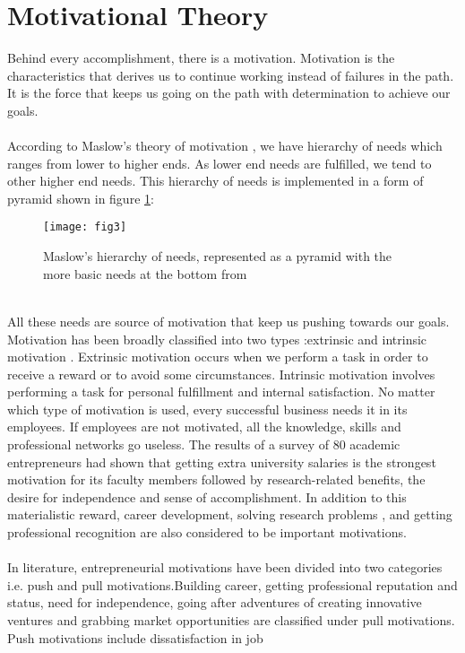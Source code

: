 \section{Motivational Theory\label{sec:motivation-based-theory}}
Behind every accomplishment, there is a motivation. Motivation is the characteristics that
derives us to continue working instead of failures in the path. It is the force that keeps us going on
the path with determination to achieve our goals.
\\
\\
According to Maslow’s theory of motivation \cite{47}, we have hierarchy of needs which ranges from
lower to higher ends. As lower end needs are fulfilled, we tend to other higher end needs. This
hierarchy of needs is implemented in a form of pyramid shown in figure \ref{fig3}:
\begin{figure}[!h]
	\centering
	\texttt{[image: fig3]}
	\caption{Maslow's hierarchy of needs, represented as a pyramid with the more basic needs at
		the bottom from \cite{47}}
	\label{fig3}
\end{figure}
\\
All these needs are source of motivation that keep us pushing towards our goals. Motivation has
been broadly classified into two types :extrinsic and intrinsic motivation \cite{48}. Extrinsic motivation
occurs when we perform a task in order to receive a reward or to avoid some circumstances.
Intrinsic motivation involves performing a task for personal fulfillment and internal satisfaction. No
matter which type of motivation is used, every successful business needs it in its employees. If
employees are not motivated, all the knowledge, skills and professional networks go useless. The
results of a survey of 80 academic entrepreneurs \cite{49} had shown that getting extra university
salaries is the strongest motivation for its faculty members followed by research-related benefits,
the desire for independence and sense of accomplishment. In addition to this materialistic reward,
career development, solving research problems , and getting professional recognition are also
considered to be important motivations.
\\
\\
In literature, entrepreneurial motivations have been divided into two categories i.e. push and pull
motivations.Building career, getting professional reputation and status,
need for independence, going after adventures of creating innovative ventures and grabbing market
opportunities are classified under pull motivations. Push motivations include dissatisfaction in job
